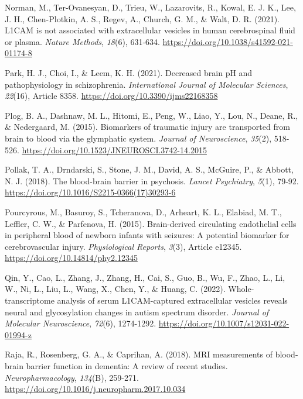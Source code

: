 \documentclass[authordate, empirical]{jote-new-article}
\begin{document}
	Norman, M., Ter-Ovanesyan, D., Trieu, W., Lazarovits, R., Kowal, E. J. K., Lee, J. H., Chen-Plotkin, A. S., Regev, A., Church, G. M., \& Walt, D. R. (2021). L1CAM is not associated with extracellular vesicles in human cerebrospinal fluid or plasma. \emph{Nature Methods},\emph{ 18}(6), 631-634. \url{https://doi.org/10.1038/s41592-021-01174-8}



	Park, H. J., Choi, I., \& Leem, K. H. (2021). Decreased brain pH and pathophysiology in schizophrenia. \emph{International Journal of Molecular Sciences},\emph{ 22}(16), Article 8358. \url{https://doi.org/10.3390/ijms22168358}



	Plog, B. A., Dashnaw, M. L., Hitomi, E., Peng, W., Liao, Y., Lou, N., Deane, R., \& Nedergaard, M. (2015). Biomarkers of traumatic injury are transported from brain to blood via the glymphatic system. \emph{Journal of Neuroscience},\emph{ 35}(2), 518-526. \url{https://doi.org/10.1523/JNEUROSCI.3742-14.2015}



	Pollak, T. A., Drndarski, S., Stone, J. M., David, A. S., McGuire, P., \& Abbott, N. J. (2018). The blood-brain barrier in psychosis. \emph{Lancet Psychiatry},\emph{ 5}(1), 79-92. \url{https://doi.org/10.1016/S2215-0366(17)30293-6}



	Pourcyrous, M., Basuroy, S., Tcheranova, D., Arheart, K. L., Elabiad, M. T., Leffler, C. W., \& Parfenova, H. (2015). Brain-derived circulating endothelial cells in peripheral blood of newborn infants with seizures: A potential biomarker for cerebrovascular injury. \emph{Physiological Reports},\emph{ 3}(3), Article e12345. \url{https://doi.org/10.14814/phy2.12345}



	Qin, Y., Cao, L., Zhang, J., Zhang, H., Cai, S., Guo, B., Wu, F., Zhao, L., Li, W., Ni, L., Liu, L., Wang, X., Chen, Y., \& Huang, C. (2022). Whole-transcriptome analysis of serum L1CAM-captured extracellular vesicles reveals neural and glycosylation changes in autism spectrum disorder. \emph{Journal of Molecular Neuroscience},\emph{ 72}(6), 1274-1292. \url{https://doi.org/10.1007/s12031-022-01994-z}



	Raja, R., Rosenberg, G. A., \& Caprihan, A. (2018). MRI measurements of blood-brain barrier function in dementia: A review of recent studies. \emph{Neuropharmacology}, \emph{134}(B), 259-271. \url{https://doi.org/10.1016/j.neuropharm.2017.10.034}
\end{document}
